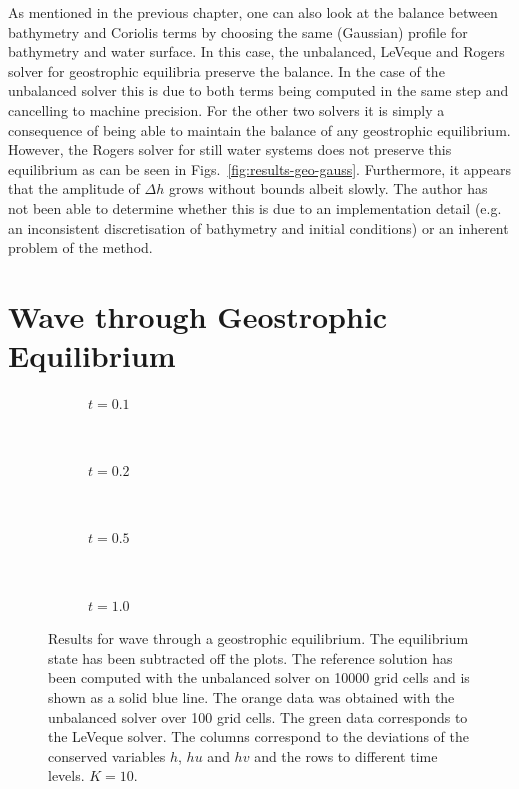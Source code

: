 As mentioned in the previous chapter, one can also look at the balance between bathymetry and Coriolis terms by choosing the same (Gaussian) profile for bathymetry and water surface. In this case, the unbalanced, LeVeque and Rogers solver for geostrophic equilibria preserve the balance. In the case of the unbalanced solver this is due to both terms being computed in the same step and cancelling to machine precision. For the other two solvers it is simply a consequence of being able to maintain the balance of any geostrophic equilibrium. However, the Rogers solver for still water systems does not preserve this equilibrium as can be seen in Figs.~\ref{fig:results-geo-gauss}. Furthermore, it appears that the amplitude of $\Delta h$ grows without bounds albeit slowly. The author has not been able to determine whether this is due to an implementation detail (e.g. an inconsistent discretisation of bathymetry and initial conditions) or an inherent problem of the method.

\section{Wave through Geostrophic Equilibrium}

\begin{figure}
  \centering
  \begin{subfigure}{\textwidth}
    \caption{$t = 0.1$}
    \label{fig:results-geo-wave-1}
  \end{subfigure} \\
  \begin{subfigure}{\textwidth}
    \caption{$t = 0.2$}
    \label{fig:results-geo-wave-2}
  \end{subfigure} \\
  \begin{subfigure}{\textwidth}
    \caption{$t = 0.5$}
    \label{fig:results-geo-wave-5}
  \end{subfigure} \\
  \begin{subfigure}{\textwidth}
    \caption{$t = 1.0$}
    \label{fig:results-geo-wave-10}
  \end{subfigure}
  \caption{Results for wave through a geostrophic equilibrium. The equilibrium state has been subtracted off the plots. The reference solution has been computed with the unbalanced solver on 10000 grid cells and is shown as a solid blue line. The orange data was obtained with the unbalanced solver over 100 grid cells. The green data corresponds to the LeVeque solver. The columns correspond to the deviations of the conserved variables $h$, $hu$ and $hv$ and the rows to different time levels. $K = 10$.}
  \label{fig:results-geo-wave}
\end{figure}

